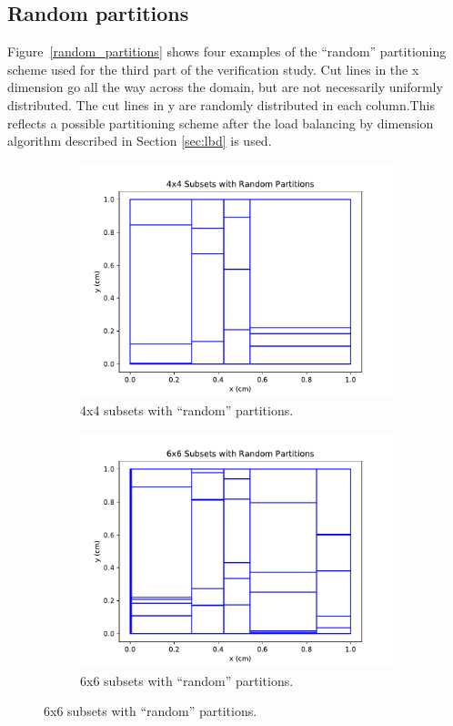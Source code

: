\subsection{Random partitions}
Figure~\ref{random_partitions} shows four examples of the ``random'' partitioning scheme used for the third part of the verification study. Cut lines in the x dimension go all the way across the domain, but are not necessarily uniformly distributed. The cut lines in y are randomly distributed in each column.This reflects a possible partitioning scheme after the load balancing by dimension algorithm described in Section \ref{sec:lbd} is used.
\begin{figure}[H]
\centering
\begin{subfigure}[b]{0.45\textwidth}
  \includegraphics[width=\textwidth]{../cut_line_files/4_random.pdf}
  \caption{4x4 subsets with ``random'' partitions.}
  \label{4random}
\end{subfigure}
\begin{subfigure}[b]{0.45\textwidth}
  \includegraphics[width=\textwidth]{../cut_line_files/6_random.pdf}
  \caption{6x6 subsets with ``random'' partitions.}
  \label{6random}
\end{subfigure}


\end{figure}
